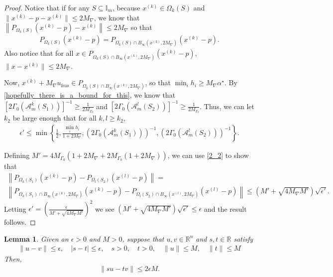\documentclass{article}
\newtheorem{lemma}[theorem]{Lemma}
\theoremstyle{case}
\newcommand{\huff}{{\Gamma_0}}
\newcommand{\maxgrad}{{M_{\nabla}}}
\newcommand{\minanglealpha}{{ \alpha^{\star} }}
\newcommand{\minangleu}{{u_{\textrm{feas}}}}
\newcommand{\reals}{\mathbb R}
\newcommand{\Rn}{\mathbb R^n}
\newcommand{\xk}{{x^{(k)}}}
\begin{document}
\begin{proof}
Notice that if for any $S \subseteq \mathbb I_m$,
because $\xk \in \Omega_k(S)$ and $\|\xk - p - \xk\| \le 2\maxgrad $, we know that 
$\left\|P_{\Omega_k(S)}\left(\xk - p \right) - \xk \right\| \le 2\maxgrad$
so that 
\begin{align*}
P_{\Omega_k(S)                 							  }\left(\xk - p \right) = 
P_{\Omega_k(S) \cap B_{\infty}\left(\xk, 2\maxgrad\right) }\left(\xk - p\right).
\end{align*}
Also notice that for all $x \in P_{\Omega_k(S) \cap B_{\infty}\left(\xk, 2\maxgrad\right) }\left(\xk - p\right)$,
$\|x - \xk\| \le 2\maxgrad$.

Now, $\xk + \maxgrad \minangleu \in P_{\Omega_k(S) \cap B_{\infty}\left(\xk, 2\maxgrad\right) }$,
so that $\min_i h_i \ge \maxgrad \minanglealpha$.
By \cref{hopefully_there_is_a_bound_for_this}, we know that 
$\left[2\huff\left(\mathcal A^k_m\left(S_1\right)\right)\right]^{-1} \ge \frac 1 {2M_{\Gamma_0}}$ and
$\left[2\huff\left(\mathcal A^l_m\left(S_2\right)\right)\right]^{-1} \ge \frac 1 {2M_{\Gamma_0}}$.
Thus, we can let $k_2$ be large enough that for all $k, l \ge k_2$,
\begin{align*}
\epsilon' \le \min\left\{
\frac 1 2,
\frac{\min_i h_i}{1 + 2\maxgrad},
\left(2\huff\left(\mathcal A^k_m\left(S_1\right)\right)\right)^{-1},
\left(2\huff\left(\mathcal A^l_m\left(S_2\right)\right)\right)^{-1}\right\}.
\end{align*}

Defining $M' = 4M_{\Gamma_0}\left(1 + 2\maxgrad + 2M_{\Gamma_0}\left(1 + 2\maxgrad\right)\right)$, 
we can use \cref{2_2} to show that
\begin{align*}
\left\| 
  P_{\Omega_k(S_1)}\left(\xk - p\right) - P_{\Omega_l(S_2)}\left(x^{(l)} - p \right)
\right\| = \\
\left\| 
  P_{\Omega_k(S_1) \cap B_{\infty}\left(\xk, 2\maxgrad\right)}\left(\xk - p\right) - P_{\Omega_l(S_2) \cap B_{\infty}\left(x^{(l)}, 2\maxgrad\right)}\left(x^{(l)} - p \right)
\right\| \le \left( M' + \sqrt{4\maxgrad M'}\right)\sqrt{\epsilon'}.
\end{align*}
Letting 
$\epsilon' = \left(\frac{\epsilon}{ M' + \sqrt{4\maxgrad M'}}\right)^2$
we see
$ \left( M' + \sqrt{4\maxgrad M'}\right)\sqrt{\epsilon'} \le \epsilon$
and the result follows.
\end{proof}






\begin{lemma}
\label{the_simple_bound_one}
Given an $\epsilon > 0$ and $M > 0$, suppose that $u,v \in \Rn$ and $s,t \in \reals$ satisfy
\begin{align}
\|u - v \| \le \epsilon, \quad
|s - t | \le \epsilon, \quad
s > 0, \quad
t > 0, \quad
\|u\| \le M, \quad
\|t\| \le M
\end{align}
Then,
\begin{align}
\bigg\|su - tv\bigg\| \le 2\epsilon M.
\end{align}
\end{lemma}
\end{document}
